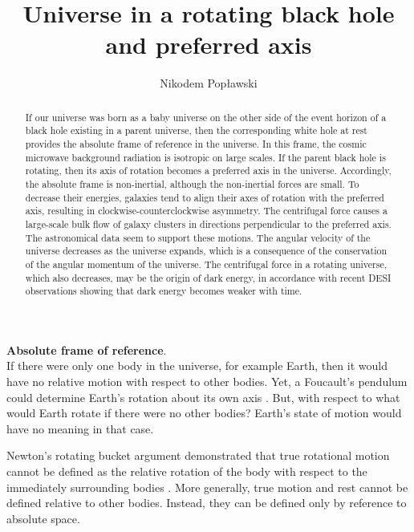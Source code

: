 \documentclass[prd,onecolumn,nofootinbib]{revtex4}
\begin{document}
\title{Universe in a rotating black hole and preferred axis}
\author{Nikodem Pop{\l}awski}


\begin{abstract}
If our universe was born as a baby universe on the other side of the event horizon of a black hole existing in a parent universe, then the corresponding white hole at rest provides the absolute frame of reference in the universe.
In this frame, the cosmic microwave background radiation is isotropic on large scales.
If the parent black hole is rotating, then its axis of rotation becomes a preferred axis in the universe.
Accordingly, the absolute frame is non-inertial, although the non-inertial forces are small.
To decrease their energies, galaxies tend to align their axes of rotation with the preferred axis, resulting in clockwise-counterclockwise asymmetry.
The centrifugal force causes a large-scale bulk flow of galaxy clusters in directions perpendicular to the preferred axis.
The astronomical data seem to support these motions.
The angular velocity of the universe decreases as the universe expands, which is a consequence of the conservation of the angular momentum of the universe.
The centrifugal force in a rotating universe, which also decreases, may be the origin of dark energy, in accordance with recent DESI observations showing that dark energy becomes weaker with time.
\end{abstract}
\maketitle


\noindent
{\bf Absolute frame of reference}.\\
If there were only one body in the universe, for example Earth, then it would have no relative motion with respect to other bodies.
Yet, a Foucault's pendulum could determine Earth's rotation about its own axis \cite{LL1}.
But, with respect to what would Earth rotate if there were no other bodies?
Earth's state of motion would have no meaning in that case.

Newton's rotating bucket argument demonstrated that true rotational motion cannot be defined as the relative rotation of the body with respect to the immediately surrounding bodies \cite{Newton}.
More generally, true motion and rest cannot be defined relative to other bodies. Instead, they can be defined only by reference to absolute space.
\end{document}
